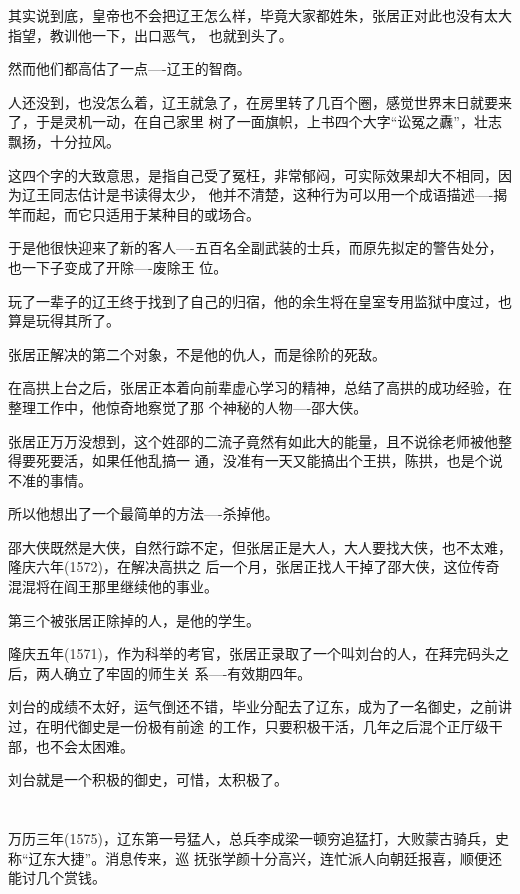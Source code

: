 \documentclass[11pt,a4paper,onecolumn]{article}
\begin{document}
其实说到底，皇帝也不会把辽王怎么样，毕竟大家都姓朱，张居正对此也没有太大指望，教训他一下，出口恶气，
也就到头了。

然而他们都高估了一点----辽王的智商。

人还没到，也没怎么着，辽王就急了，在房里转了几百个圈，感觉世界末日就要来了，于是灵机一动，在自己家里
树了一面旗帜，上书四个大字``讼冤之纛''，壮志飘扬，十分拉风。

这四个字的大致意思，是指自己受了冤枉，非常郁闷，可实际效果却大不相同，因为辽王同志估计是书读得太少，
他并不清楚，这种行为可以用一个成语描述----揭竿而起，而它只适用于某种目的或场合。

于是他很快迎来了新的客人----五百名全副武装的士兵，而原先拟定的警告处分，也一下子变成了开除----废除王
位。

玩了一辈子的辽王终于找到了自己的归宿，他的余生将在皇室专用监狱中度过，也算是玩得其所了。

张居正解决的第二个对象，不是他的仇人，而是徐阶的死敌。

在高拱上台之后，张居正本着向前辈虚心学习的精神，总结了高拱的成功经验，在整理工作中，他惊奇地察觉了那
个神秘的人物----邵大侠。

张居正万万没想到，这个姓邵的二流子竟然有如此大的能量，且不说徐老师被他整得要死要活，如果任他乱搞一
通，没准有一天又能搞出个王拱，陈拱，也是个说不准的事情。

所以他想出了一个最简单的方法----杀掉他。

邵大侠既然是大侠，自然行踪不定，但张居正是大人，大人要找大侠，也不太难，隆庆六年(1572)，在解决高拱之
后一个月，张居正找人干掉了邵大侠，这位传奇混混将在阎王那里继续他的事业。

第三个被张居正除掉的人，是他的学生。

隆庆五年(1571)，作为科举的考官，张居正录取了一个叫刘台的人，在拜完码头之后，两人确立了牢固的师生关
系----有效期四年。

刘台的成绩不太好，运气倒还不错，毕业分配去了辽东，成为了一名御史，之前讲过，在明代御史是一份极有前途
的工作，只要积极干活，几年之后混个正厅级干部，也不会太困难。

刘台就是一个积极的御史，可惜，太积极了。

\section[\thesection]{}

万历三年(1575)，辽东第一号猛人，总兵李成梁一顿穷追猛打，大败蒙古骑兵，史称``辽东大捷''。消息传来，巡
抚张学颜十分高兴，连忙派人向朝廷报喜，顺便还能讨几个赏钱。
\end{document}
